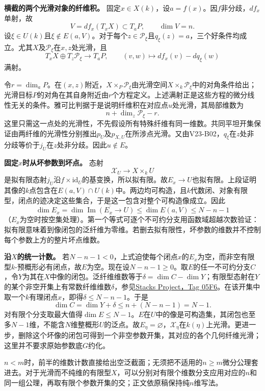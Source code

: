 \documentclass[UTF8,a4paper]{ctexbook}
\newcommand{\id}{\mathrm{id}}
\newcommand{\lead}[1]{\par\noindent\textbf{#1}\quad}
\begin{document}
\lead{横截的两个光滑对象的纤维积。}
固定$x\in X(k)$，设$a=f(x)$。因$f$非分歧，$df_x$单射，故
\[
V=df_x(T_xX)\subset T_aP,\qquad \dim V=n.
\]
设$\xi\in U(k)$且$\xi\notin E(a,V)$。对于每个$z\in\mathcal P_\xi$且$q_\xi(z)=a$，三个好条件均成立。尤其$X$及$\mathcal P_\xi$在$x,z$处光滑，且
\[
T_xX\oplus T_z\mathcal P_\xi\longrightarrow T_aP,
\qquad(v,w)\longmapsto df_x(v)-dq_\xi(w)
\]
满射。

令$r=\dim_aP$。在$(x,z)$附近，$X\times_P\mathcal P_\xi$由光滑空间$X\times_k\mathcal P_\xi$中的对角条件给出；光滑目标$P$的对角在其自身附近由$r$个方程定义。上述满射正是这些方程的微分线性无关的条件。雅可比判据于是说明纤维积在对应点$u$处光滑，其局部维数为
\[
n+\dim_z\mathcal P_\xi-r.
\]
这里只需这一点处的光滑性，不先假设所有特殊纤维有同一维数。共同平坦开集保证由两纤维的光滑性分别推出$p_U$及$p_{X,U}$在所涉点光滑。又由V23-B02，$q_\xi$在$z$处非分歧等价于$j_U$在$z$处非分歧。因此$u\notin E$。

\lead{固定$x$时从坏参数到坏点。}
态射
\[
\mathcal X_U\longrightarrow X\times_kU
\]
是拟有限态射$j_U$沿$f\times\id_U$的基变换，所以拟有限。故$E_x\to U$也拟有限。上段证明其像的$k$点包含在$E(a,V)\cap U(k)$中。两边均可构造，且$k$代数闭、对象有限型，闭点的迹决定这些集合，于是这一包含对整个可构造像成立。因此
\[
\dim E_x=\dim \overline{\operatorname{Im}(E_x\to U)}
\leq\dim E(a,V)\leq N-n-1
\]
（$E_x$为空时按空集处理）。第一个等式可逐个不可约分支用函数域超越次数验证：拟有限意味着到像闭包的泛纤维为零维。若删去拟有限性，坏参数的维数并不控制每个参数上方的整片坏点维数。

\lead{沿$X$的统一计数。}
若$N-n-1<0$，上式迫使每个闭点$x$的$E_x$为空，而非空有限型$k$-预概形必有闭点，故$E$为空。现在设$N-n-1\geq0$。取$E$的任一不可约分支$C$，令$Y$为其在$X$中像的闭包。泛纤维维数等于$\delta=\dim C-\dim Y$；有限型态射在$Y$的某个非空开集上有常数纤维维数$\delta$，参见\href{https://stacks.math.columbia.edu/tag/05F6}{Stacks Project，Tag 05F6}。在该开集中取一个$k$有理闭点$x$，即得$\delta\leq N-n-1$。于是
\[
\dim C=\dim Y+\delta\leq n+(N-n-1)=N-1.
\]
对有限个分支取最大值得$\dim E\leq N-1$。$E$在$U$中的像是可构造集，其闭包也至多$N-1$维，不能含$N$维整概形$U$的泛点。故$E_\eta=\varnothing$，$\mathcal X_\eta$在$k(\eta)$上光滑。更进一步，删除这个坏像的闭包可得到一个非空参数开集，其对应的各个几何纤维光滑；这里并不要求原始参数底$G$约化。

$n<m$时，前半的维数计数直接给出空泛截面；无须把不适用的$n\geq m$微分公理套进去。对于光滑而不纯维的有限型$X$，可以分别对有限个维数分支应用对应的$n$和同一组公理，再取有限个参数开集的交；正文依原稿保持纯$n$维写法。
\end{document}
